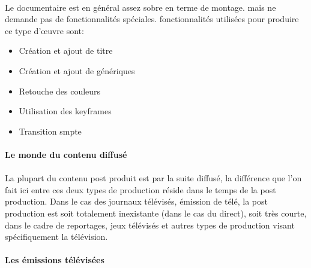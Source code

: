 \paragraph{} Le documentaire est en général assez sobre en terme de
montage. %
mais ne demande pas de fonctionnalités spéciales. %
fonctionnalités utilisées pour produire ce type d'œuvre sont:
\begin{itemize} \setlength{\itemsep}{2mm}
  \item{Création et ajout de titre} \item{Création et ajout de
  génériques} \item{Retouche des couleurs} \item{Utilisation
  des keyframes} \item{Transition smpte }
\end{itemize}

\paragraph{Le monde du contenu diffusé}

\paragraph{}
La plupart du contenu post produit est par la suite diffusé,
la différence que l'on fait ici entre ces deux types de production
réside dans le temps de la post production.  Dans le cas des journaux
télévisés, émission de télé, la post production est soit totalement
inexistante (dans le cas du direct), soit très courte, dans le cadre
de reportages, jeux télévisés et autres types de production visant
spécifiquement la télévision.

\paragraph {Les émissions télévisées}

\paragraph{}

